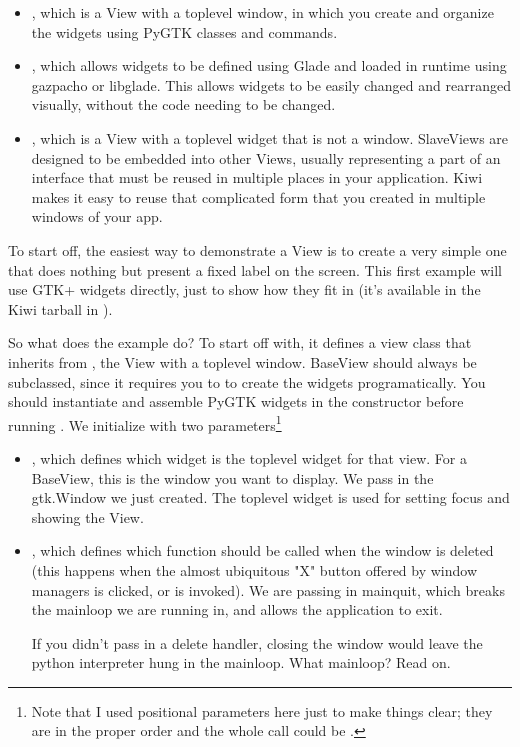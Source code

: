 \documentclass[a4paper]{howto}
\begin{document}
\begin{itemize}
\item {}, which is a View with a toplevel window, in which
you create and organize the widgets using PyGTK classes and commands.
\item {}, which allows widgets to be defined using Glade
and loaded in runtime using gazpacho or libglade. This allows widgets to
be easily changed and rearranged visually, without the code needing
to be changed.
\item {}, which is a View with a toplevel widget that is
not a window. SlaveViews are designed to be embedded into other Views,
usually representing a part of an interface that must be reused in
multiple places in your application. Kiwi makes it easy to reuse that
complicated form that you created in multiple windows of your app.
\end{itemize}

To start off, the easiest way to demonstrate a View is to create a very
simple one that does nothing but present a fixed label on the screen.
This first example will use GTK+ widgets directly, just to show how they
fit in (it's available in the Kiwi tarball in
).





So what does the example do? To start off with, it defines a view class
that inherits from , the View with a toplevel window.
BaseView should always be subclassed, since it requires you to to create
the widgets programatically.  You should instantiate and assemble PyGTK
widgets in the constructor before running
. We initialize  with
two parameters\footnote{Note that I used positional parameters here just
to make things clear; they are in the proper order and the whole call
could be .}

\begin{itemize}
\item {}, which defines which widget is the toplevel
widget for that view. For a BaseView, this is the window you want to
display. We pass in the gtk.Window we just created. The toplevel widget
is used for setting focus and showing the View.
\item {}, which defines which function should be
called when the window is deleted (this happens when the almost ubiquitous "X"
button offered by window managers is clicked, or  is
invoked). We are passing in mainquit, which breaks the mainloop we are
running in, and allows the application to exit.

If you didn't pass in a delete handler, closing the window would leave
the python interpreter hung in the mainloop. What mainloop? Read on.
\end{itemize}
\end{document}
